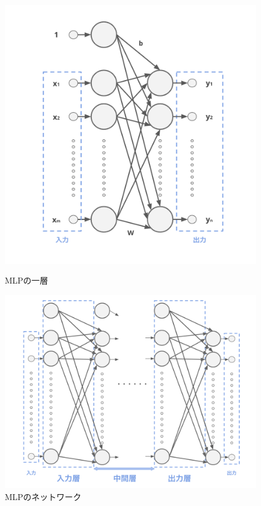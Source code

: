 \begin{figure}[b]
\centering
\begin{minipage}{0.4\hsize}
\centering
\includegraphics[width=0.95\hsize]{figure/mlp_net0.png}
\caption{MLPの一層}
\label{fig:MLP_net0}
\end{minipage}
\begin{minipage}{0.55\hsize}
\centering
\includegraphics[width=0.9\hsize]{figure/mlp_net1.png}
\caption{MLPのネットワーク}
\label{fig:MLP_net1}
\end{minipage}
\end{figure}


